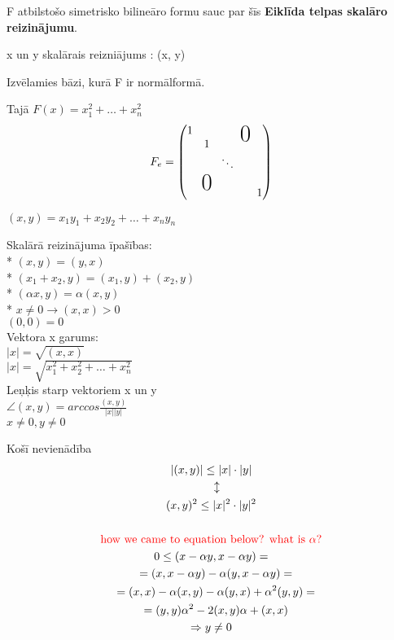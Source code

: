 \documentclass[12pt]{article}
\begin{document}
F atbilstošo simetrisko bilineāro formu sauc par šīs \textbf{Eiklīda telpas skalāro reizinājumu}. 

x un y skalārais reizniājums : (x, y)

Izvēlamies bāzi, kurā F ir normālformā.

\newcommand\x{\times}
\newcommand\bigzero{\makebox(0,0){\text{\huge0}}}
\newcommand*{\bord}{\multicolumn{1}{c|}{}}

Tajā $F(x)= x_1^2+ \ldots + x_n^2 $
\begin{gather*}
	F_e = 
	\begin{pmatrix}
	1 & && \bigzero   \\ 
    	& 1 &  \\
	& &  \ddots  &\\ 
        & \bigzero  &  \\
    	& &  & &  1  \\ 	
    \end{pmatrix}
\end{gather*}

$(x,y) = x_1y_1 + x_2y_2 + \ldots + x_ny_n$

Skalārā reizinājuma īpašības: \\
* $(x,y) = (y,x)$ \\
* $(x_1+x_2, y) = (x_1,y) + (x_2,y)$ \\
* $(\alpha x,y)= \alpha(x,y)$ \\
* $ x \neq 0 \rightarrow (x,x) > 0$ \\
$(0,0) = 0$ \\

Vektora x garums: \\
$|x| = \sqrt{(x,x)}$ \\
$|x| = \sqrt{x_1^2 + x_2^2 + \ldots + x_n^2}$ \\

Leņķis starp vektoriem x un y \\
$\angle (x,y) = arccos \frac{(x,y)}{|x||y|}$ \\ 
$x \neq 0, y \neq 0$

\pagebreak

Košī nevienādība
\begin{gather*}
|(x,y)| \leq |x| \cdot |y|  \\
  \quad \updownarrow \\
(x,y)^2 \leq |x|^2 \cdot |y|^2  \\
\\
\textcolor{red}{\text{how we came to equation below? what is } \alpha ?} \\
 0 \leq (x - \alpha y, x-\alpha y) =  \\
 \; \; \; = (x, x - \alpha y) - \alpha (y, x - \alpha y) = \\
 \; \; \; =  (x,x) - \alpha (x,y) - \alpha (y,x) + \alpha^2 (y,y) = \\
 \; \; \; = (y,y) \alpha^2 - 2 (x,y) \alpha + (x,x) \\
\Rightarrow  y \neq 0
\end{gather*}
\end{document}

